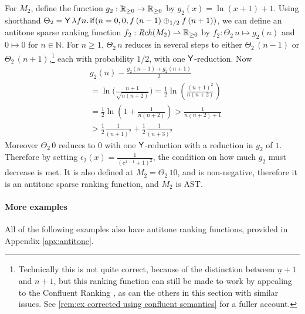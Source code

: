 \begin{example}
\label{ex:unbiased random walk}
For $M_2$, define the function $g_2 : \mathbb{R}_{{\geq}0} \to \mathbb{R}_{{\geq}0}$ by $g_2(x) = \ln(x+1) + 1$.
Using shorthand 
$\Theta_2 = \mathsf{Y} \, \lambda f n . \, 
\mathsf{if}(n = 0, 0, f \, (n - 1) \oplus_{1/2} f \, (n + 1))$, 
we can define an antitone sparse ranking function $f_2 : \mathit{Rch}(M_2) \rightharpoonup \mathbb{R}_{{\geq}0}$ 
by
\(
f_2: {\Theta_2} \, n \mapsto 
g_2(n)
\)
and
$0 \mapsto 0$
for $n \in \mathbb N$.
For $n \geq 1$, $\Theta_2 \, n$ reduces in several steps to either $\Theta_2 \, (n-1)$ or $\Theta_2 \, (n+1)$,\footnote{Technically this is not quite correct, because of the distinction between $\underline n + 1$ and $\underline{n + 1}$, but this ranking function can still be made to work by appealing to the Confluent Ranking , as can the others in this section with similar issues. See \cref{rem:ex corrected using confluent semantics} for a fuller account.} each with probability $1/2$, with one $\mathsf{Y}$-reduction.
Now
\begin{align*}%
& g_2(n) - \frac{g_2(n-1) + g_2(n+1)} 2 \\
  &=  \ln \Big(\frac{n+1}{\sqrt{n(n+2)}}\Big) 
  =  \frac 1 2 \ln\left(\frac{(n+1)^2}{n(n+2)}\right) \\
  &=  \frac 1 2 \ln\left(1 + \frac 1 {n(n+2)}\right) 
  >  \frac 1 {n(n+2) + 1} \\
  &>  \frac 1 2 \frac 1 {(n+1)^2} + \frac 1 2 \frac 1 {(n+3)^2}
\end{align*}
Moreover $\Theta_2 \, 0$ reduces to $0$ with one $\mathsf{Y}$-reduction with a reduction in $g_2$ of $1$.
Therefore by setting $\epsilon_2(x) = \frac 1 {(e^{x-1}+1)^2}$, the condition on how much $g_2$ must decrease is met. It is also defined at $M_2 = \Theta_2 \, 10$, and is non-negative, therefore it is an antitone sparse ranking function, and $M_2$ is AST.
\end{example}

\paragraph*{More examples} All of the following examples also have antitone ranking functions, provided in Appendix \ref{apx:antitone}.

